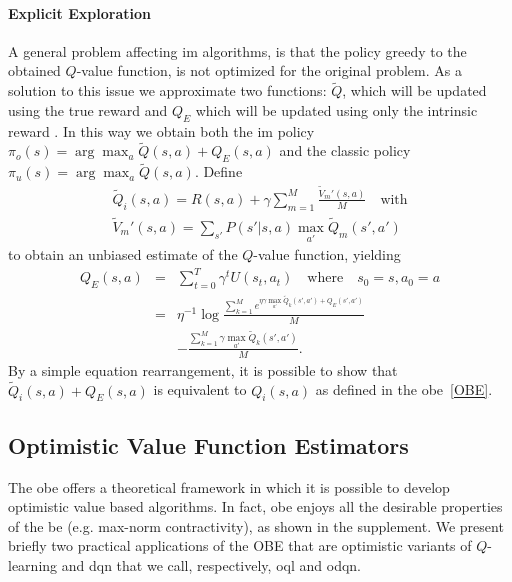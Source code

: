 \paragraph{Explicit Exploration} A general problem affecting \gls{im} algorithms, is that the policy greedy to the obtained $Q$-value function, is not optimized for the original problem. As a solution to this issue we approximate two functions: $\tilde{Q}$, which will be updated using the true reward and $Q_E$ which will be updated using only the intrinsic reward \cite{szita2008many}. In this way we obtain both the \gls{im} policy $\pi_o(s) = \arg \max_{a} \tilde{Q}(s,a) + Q_E(s,a)$ and the classic policy  $\pi_u(s) = \arg \max_{a} \tilde{Q}(s,a)$.
Define 
\begin{eqnarray}
	\tilde{Q}_i(s,a) = R(s,a) + \gamma \sum_{m=1}^M\frac{\tilde{V}_m'(s,a)}{M} \quad \text{with} \\
	\tilde{V}_m'(s,a) =  \sum_{s'} P(s'|s,a)\max_{a'}\tilde{Q}_m(s',a')
\end{eqnarray}
to obtain an unbiased estimate of the $Q$-value function, yielding
\begin{eqnarray}
Q_E(s,a) & = & \sum_{t=0}^T \gamma^t U(s_t,a_t) \quad \text{where} \quad s_0 = s, a_0 = a \nonumber \\
& = & \eta^{-1}\log \frac{\sum_{k=1}^M e^{\eta\gamma\max_{a'}\tilde{Q}_k(s',a') + Q_E(s',a')}}{M}\nonumber \\
& &  -  \frac{\sum_{k=1}^M \gamma\max_{a'}\tilde{Q}_k(s',a')}{M}.
\end{eqnarray}
By a simple equation rearrangement, it is possible to show that $\tilde{Q}_i(s,a) + Q_E(s,a)$ is equivalent to $Q_i(s,a)$ as defined in the \gls{obe}~\ref{OBE}.
 
\subsection{Optimistic Value Function Estimators}
The \gls{obe} offers a theoretical framework in which it is possible to develop optimistic value based algorithms. In fact, \gls{obe} enjoys all the desirable properties of the \gls{be} (e.g. max-norm contractivity), as shown in the supplement. We present briefly two practical applications of the OBE that are optimistic variants of $Q$-learning and \gls{dqn} that we call, respectively, \gls{oql} and \gls{odqn}.
